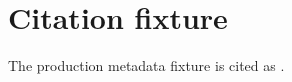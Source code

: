 \documentclass{article}
\begin{document}
\section*{Citation fixture}
The production metadata fixture is cited as \cite{arxiv:1706.03762}.


\end{document}
